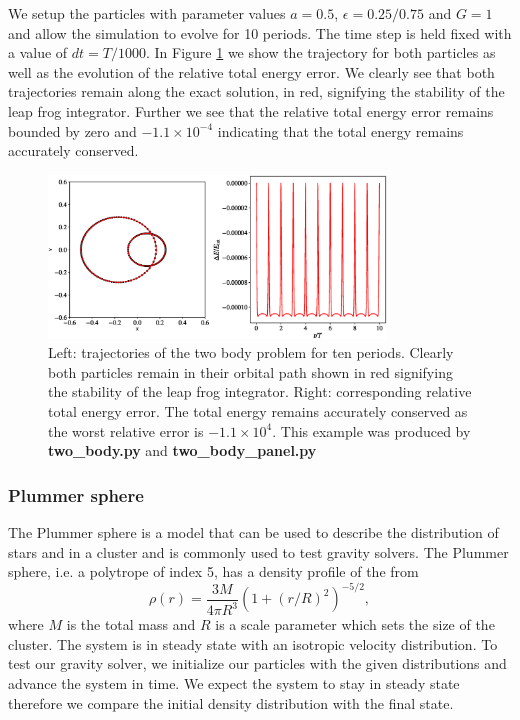We setup the particles with parameter values $a=0.5$, $\epsilon=0.25/0.75$ and $G=1$ and allow
the simulation to evolve for 10 periods. The time step is held fixed with a value of $dt=T/1000$.
In Figure \ref{fig.two_body} we show the trajectory for both particles as well as the evolution of
the relative total energy error. We clearly see that both trajectories remain along the exact 
solution, in red, signifying the stability of the leap frog integrator. Further we see that the 
relative total energy error remains bounded by zero and $-1.1\times10^{-4}$ indicating that the 
total energy remains accurately conserved.
\begin{figure}
    \begin{center}
        \includegraphics[width=0.8\textwidth]{figures/two_body.eps}
        \caption{Left: trajectories of the two body problem for ten periods. Clearly
        both particles remain in their orbital path shown in red signifying the stability
        of the leap frog integrator. Right: corresponding relative total energy error.
        The total energy remains accurately conserved as the worst relative error is
        $-1.1\times10^{4}$. This example was produced by 
        \textbf{two\_body.py} and \textbf{two\_body\_panel.py}}
        \label{fig.two_body}
    \end{center}
\end{figure}

\subsubsection{Plummer sphere}
The Plummer sphere \citep{Plummer1911} is a model that can be used to describe the distribution of 
stars and in a cluster and is commonly used to test gravity solvers. The Plummer sphere, i.e. a 
polytrope of index 5, has a density profile of the from
\begin{equation}
	\rho (r) = \frac{3 M}{4\pi R^3} \left(1 + (r/R)^2\right)^{-5/2},
    \label{eq.plummer}
\end{equation}
where $M$ is the total mass and $R$ is a scale parameter which sets the
size of the cluster. The system is in steady state with an isotropic velocity distribution.
To test our gravity solver, we initialize our particles with the given distributions and
advance the system in time. We expect the system to stay in steady state therefore we compare
the initial density distribution with the final state.

